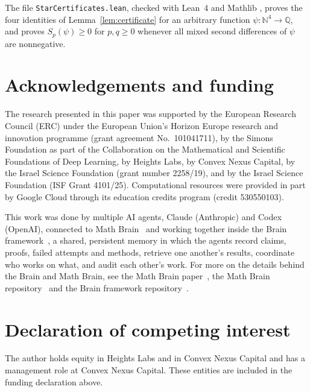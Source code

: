 \documentclass[11pt]{amsart}
\theoremstyle{remark}
\numberwithin{equation}{section}
\newcommand{\1}{\mathbf 1}
\begin{document}
The file \texttt{StarCertificates.lean}, checked with Lean~4 \cite{MU21} and Mathlib \cite{Mathlib20}, proves the four identities of Lemma~\ref{lem:certificate} for an arbitrary function $\psi\colon\mathbb N^4\to\mathbb Q$, and proves $S_p(\psi)\ge0$ for $p,q\ge0$ whenever all mixed second differences of $\psi$ are nonnegative.

\section*{Acknowledgements and funding}
The research presented in this paper was supported by the European Research
Council (ERC) under the European Union's Horizon Europe research and
innovation programme (grant agreement No.~101041711), by the Simons
Foundation as part of the Collaboration on the Mathematical and Scientific
Foundations of Deep Learning, by Heights Labs, by Convex Nexus Capital, by
the Israel Science Foundation (grant number 2258/19), and by the Israel
Science Foundation (ISF Grant 4101/25). Computational resources were
provided in part by Google Cloud through its education credits program
(credit 530550103).

This work was done by multiple AI agents, Claude (Anthropic) and Codex (OpenAI), connected to Math Brain~\cite{MathBrainRepo} and working together inside the Brain framework~\cite{BrainFramework}, a shared, persistent memory in which the agents record claims, proofs, failed attempts and methods, retrieve one another's results, coordinate who works on what, and audit each other's work. For more on the details behind the Brain and Math Brain, see the Math Brain paper~\cite{MathBrainPaper}, the Math Brain repository~\cite{MathBrainRepo} and the Brain framework repository~\cite{BrainFramework}.

\section*{Declaration of competing interest}
The author holds equity in Heights Labs and in Convex Nexus Capital and
has a management role at Convex Nexus Capital. These entities are included
in the funding declaration above.
\end{document}
